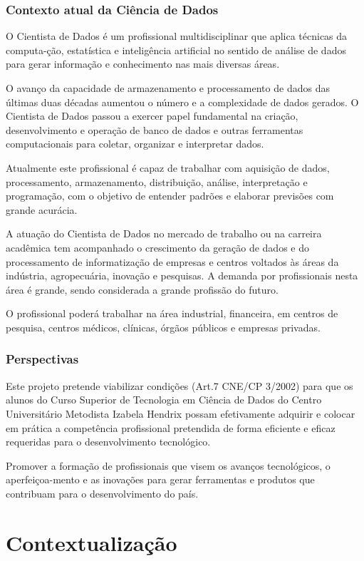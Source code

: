 \documentclass[a4paper, 12pt, openright, oneside, german, french, english, brazil]{abntex2}
\begin{document}
\subsection{Contexto atual da Ciência de Dados}

O Cientista de Dados é um profissional multidisciplinar que aplica técnicas da computa-ção, estatística e inteligência artificial no sentido de análise de dados para gerar informação e conhecimento nas mais diversas áreas.

O avanço da capacidade de armazenamento e processamento de dados das últimas duas décadas aumentou o número e a complexidade de dados gerados. O Cientista de Dados passou a exercer papel fundamental na criação, desenvolvimento e operação de banco de dados e outras ferramentas computacionais para coletar, organizar e interpretar dados.

Atualmente este profissional é capaz de trabalhar com aquisição de dados, processamento, armazenamento, distribuição, análise, interpretação e programação, com o objetivo de entender padrões e elaborar previsões com grande acurácia.

A atuação do Cientista de Dados no mercado de trabalho ou na carreira acadêmica tem acompanhado o crescimento da geração de dados e do processamento de informatização de empresas e centros voltados às áreas da indústria, agropecuária, inovação e pesquisas. A demanda por profissionais nesta área é grande, sendo considerada a grande profissão do futuro.

O profissional poderá trabalhar na área industrial, financeira, em centros de pesquisa, centros médicos, clínicas, órgãos públicos e empresas privadas.

\subsection{Perspectivas}

Este projeto pretende viabilizar condições (Art.7 CNE/CP 3/2002) para que os alunos do Curso Superior de Tecnologia em Ciência de Dados do Centro Universitário Metodista Izabela Hendrix possam efetivamente adquirir e colocar em prática a competência profissional pretendida de forma eficiente e eficaz requeridas para o desenvolvimento tecnológico.

Promover a formação de profissionais que visem os avanços tecnológicos, o aperfeiçoa-mento e as inovações para gerar ferramentas e produtos que contribuam para o desenvolvimento do país.


\chapter{Contextualização}
\end{document}
